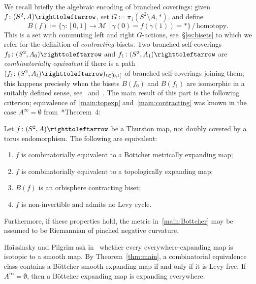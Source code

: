 \documentclass{amsart}
\begin{document}
We recall briefly the algebraic encoding of branched coverings: given
$f\colon(S^2,A)\selfmap$, set $G\coloneqq \pi_1(S^2\setminus A,*)$,
and define
\[B(f)\coloneqq\{\gamma\colon[0,1]\to\mathcal M\mid\gamma(0)=f(\gamma(1))=*\}\,/\,\text{homotopy}.
\]
This is a set with commuting left and right $G$-actions,
see~\S\ref{ss:bisets} to which we refer for the definition of
\emph{contracting} bisets. Two branched self-coverings
$f_0\colon(S^2,A_0)\selfmap$ and $f_1\colon(S^2,A_1)\selfmap$ are
\emph{combinatorially equivalent} if there is a path
$(f_t\colon(S^2,A_t)\selfmap)_{t\in[0,1]}$ of branched self-coverings
joining them; this happens precisely when the bisets $B(f_0)$ and
$B(f_1)$ are isomorphic in a suitably defined sense,
see~\cite{kameyama:thurston} and~\cite{bartholdi-dudko:bc2}. The main
result of this part is the following criterion; equivalence
of~\eqref{main:topexp} and~\eqref{main:contracting} was known in the
case $A^\infty=\emptyset$
from~\cite{haissinsky-pilgrim:algebraic}*{Theorem~4}:
\begin{mainthm}[= Theorem~\ref{thm:ExpCr}]\label{thm:main}
  Let $f\colon(S^2,A)\selfmap$ be a Thurston map, not doubly covered
  by a torus endomorphism. The following are equivalent:
  \begin{enumerate}
  \item $f$ is combinatorially equivalent to a B\"ottcher metrically expanding map;\label{main:Bottcher}
  \item $f$ is combinatorially equivalent to a topologically expanding map;\label{main:topexp}
  \item $B(f)$ is an orbisphere contracting biset;\label{main:contracting}
  \item $f$ is non-invertible and admits no Levy cycle.
  \end{enumerate}

  Furthermore, if these properties hold, the metric
  in~\eqref{main:Bottcher} may be assumed to be Riemannian of pinched
  negative curvature.
\end{mainthm}

Ha\"\i ssinsky and Pilgrim ask in~\cite{haissinsky-pilgrim:algebraic}
whether every everywhere-expanding map is isotopic to a smooth map. By
Theorem~\ref{thm:main}, a combinatorial equivalence class contains a
B\"ottcher smooth expanding map if and only if it is Levy free. If
$A^\infty =\emptyset$, then a B\"ottcher expanding map is expanding
everywhere.
\end{document}
